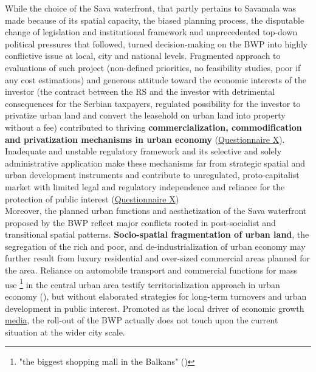 \documentclass[11pt]{report}
\begin{document}
While the choice of the Sava waterfront, that partly pertains to Savamala was made because of its spatial capacity, the biased planning process, the disputable change of legislation and institutional framework and unprecedented top-down political pressures that followed, turned decision-making on the BWP into highly conflictive issue at local, city and national levels.
Fragmented approach to evaluations of such project (non-defined priorities, no feasibility studies, poor if any cost estimations) and generous attitude toward the economic interests of the investor (the contract between the RS and the investor with detrimental consequences for the Serbian taxpayers, regulated possibility for the investor to privatize urban land and convert the leasehold on urban land into property without a fee) contributed to thriving \textbf{commercialization, commodification and privatization mechanisms in urban economy}
(\href{Questionnaire Experts Savamala}{Questionnaire X}).
Inadequate and unstable regulatory framework and its selective and solely administrative application make these mechanisms far from strategic spatial and urban development instruments and contribute to unregulated, proto-capitalist market with limited legal and regulatory independence and reliance for the protection of public interest
(\href{Questionnaire Experts Savamala}{Questionnaire X})
\\

Moreover, the planned urban functions and aesthetization of the Sava waterfront proposed by the BWP reflect major conflicts rooted in post-socialist and transitional spatial patterns.
\textbf{Socio-spatial fragmentation of urban land}, the segregation of the rich and poor, and de-industrialization of urban economy may further result from luxury residential and over-sized commercial areas planned for the area.
Reliance on automobile transport and commercial functions for mass use
\footnote{"the biggest shopping mall in the Balkans" (\cite{media})}
in the central urban area testify territorialization approach in urban economy (\href{Hirt}{\cite{hirt_belgrade_2009}}), but without elaborated strategies for long-term turnovers and urban development in public interest.
Promoted as the local driver of economic growth \href{ref}{media}, the roll-out of the BWP actually does not touch upon the current situation at the wider city scale.
\\
\end{document}
